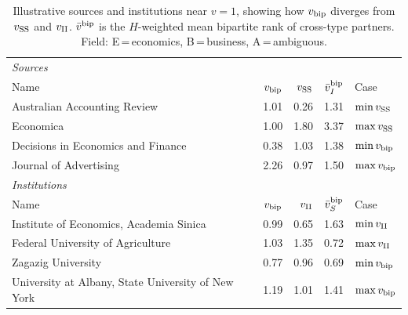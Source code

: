 \begin{table}[htbp]
\centering\small
\caption{Illustrative sources and institutions near $v=1$, showing how
$v_{\rm bip}$ diverges from $v_{\rm SS}$ and $v_{\rm II}$.
$\bar{v}^{\rm bip}$ is the $H$-weighted mean bipartite rank of cross-type
partners. Field: E\,=\,economics, B\,=\,business, A\,=\,ambiguous.}
\label{tab:unit_effects}
\begin{tabular}{lrrrl}
\toprule
\multicolumn{5}{l}{\textit{Sources}} \\[2pt]
Name & $v_{\rm bip}$ & $v_{\rm SS}$ & $\bar{v}_{I}^{\rm bip}$ & Case \\
\midrule
Australian Accounting Review & 1.01 & 0.26 & 1.31 & $\min v_{\rm SS}$ \\
Economica & 1.00 & 1.80 & 3.37 & $\max v_{\rm SS}$ \\
Decisions in Economics and Finance & 0.38 & 1.03 & 1.38 & $\min v_{\rm bip}$ \\
Journal of Advertising & 2.26 & 0.97 & 1.50 & $\max v_{\rm bip}$ \\
\midrule
\multicolumn{5}{l}{\textit{Institutions}} \\[2pt]
Name & $v_{\rm bip}$ & $v_{\rm II}$ & $\bar{v}_{S}^{\rm bip}$ & Case \\
\midrule
Institute of Economics, Academia Sinica & 0.99 & 0.65 & 1.63 & $\min v_{\rm II}$ \\
Federal University of Agriculture & 1.03 & 1.35 & 0.72 & $\max v_{\rm II}$ \\
Zagazig University & 0.77 & 0.96 & 0.69 & $\min v_{\rm bip}$ \\
University at Albany, State University of New York & 1.19 & 1.01 & 1.41 & $\max v_{\rm bip}$ \\
\bottomrule
\end{tabular}
\end{table}
